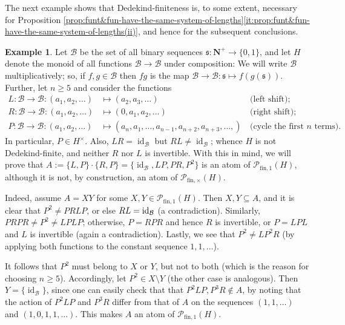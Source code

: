 \documentclass{report}
\renewcommand{\P}{\mathcal{P}}
\newcommand{\funt}{{\textrm{fin}, \times}}
\newcommand{\fun}{{\textrm{fin}, 1}}
\renewcommand{\:}{\text{:}}
\theoremstyle{definition}
\newtheorem{eg}[defn]{Example}
\begin{document}
%
The next example shows that Dedekind-finiteness is, to some extent, necessary for Proposition \ref{prop:funt&fun-have-the-same-system-of-lengths}\ref{it:prop:funt&fun-have-the-same-system-of-lengths(ii)}, and hence for the subsequent conclusions. 
%
\begin{eg}\label{exa:no-dedekind-finiteness}
	Let $\mathcal{B}$ be the set of all binary sequences $\mathfrak{s}: \mathbf N^+ \to \{0,1\}$, and let $H$ denote the monoid of all functions $\mathcal{B} \to \mathcal{B}$ under composition: We will write $\mathcal{B}$ multiplicatively; so, if $f, g \in \mathcal{B}$ then $fg$ is the map $\mathcal{B} \to \mathcal{B}: \mathfrak{s} \mapsto f(g(\mathfrak s))$.
	Further, let $n\ge 5$ and consider the functions 
	\begin{align*}
	L: \mathcal{B} \to\mathcal{B}: (a_1,a_2,\dots) &\mapsto (a_2,a_3,\dots)  &\,\textrm{(left shift);}\\
	R: \mathcal{B} \to\mathcal{B}: (a_1,a_2,\dots) &\mapsto (0,a_1,a_2,\dots) &\,\textrm{(right shift);}\\
	P: \mathcal{B} \to\mathcal{B}: (a_1,a_2,\dots) &\mapsto (a_{n},a_1,\dots, a_{n-1}, a_{n+2}, a_{n+3},\dots,) &\,\textrm{(cycle the first $n$ terms).}
	\end{align*}
	In particular, $P \in H^\times$. Also, $LR = \operatorname{id}_\mathcal{B}$ but $RL \neq \operatorname{id}_\mathcal{B}$; whence $H$ is not Dedekind-finite, and neither $R$ nor $L$ is invertible. With this in mind, we will prove that $A:= \{L,P\} \cdot \{R,P\} = \{\operatorname{id}_\mathcal{B}, LP, PR, P^2 \}$ is an atom of $\P_\fun(H)$, although it is not, by construction, an atom of $\P_\funt(H)$.
	
	Indeed,
	assume $A = XY$ for some $X,Y\in \P_\fun(H)$.
	Then $X,Y\subseteq A$, and it is clear that $P^2 \ne PRLP$, or else $RL = {\rm id}_\mathcal{B}$ (a contradiction). Similarly, $PRPR \ne P^2 \ne LPLP$; otherwise, $P = RPR$ and hence $R$ is invertible, or $P = LPL$ and $L$ is invertible (again a contradiction). Lastly, we see that $P^2 \ne LP^2 R$ (by applying both functions to the constant sequence $1, 1, \ldots$).
	
	It follows that $P^2$ must belong to $X$ or $Y$, but not to both (which is the reason for choosing $n\ge 5$).
	Accordingly, let $P^2 \in X \setminus Y$ (the other case is analogous).
	Then $Y = \{\operatorname{id}_\mathcal{B}\}$, since one can easily check that that $P^2LP, P^3R \notin A$, by noting that the action of $P^2LP$ and $P^3R$ differ from that of $A$ on the sequences $(1,1,\ldots)$ and $(1,0,1,1,\ldots)$. This makes $A$ an atom of $\P_\fun(H)$.
\end{eg}
\end{document}
